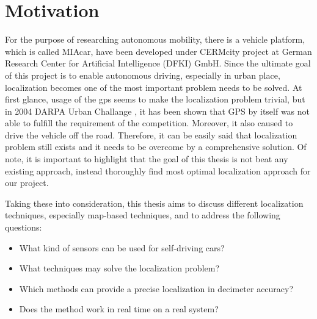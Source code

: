 \section{Motivation}
\par For the purpose of researching autonomous mobility, there is a vehicle platform, which is called MIAcar, have been developed under CERMcity project at  German Research Center for Artificial Intelligence (DFKI) GmbH. Since the ultimate goal of this project is to enable autonomous driving, especially in urban place, localization becomes one of the most important problem needs to be solved. At first glance, usage of the \acrfull{gps} seems to make the localization problem trivial, but in 2004 DARPA Urban Challange \cite{chp2.4}, it has been shown that GPS by itself was not able to fulfill the requirement of the competition. Moreover, it also caused to drive the vehicle off the road. Therefore, it can be easily said that localization problem still exists and it needs to be overcome by a comprehensive solution. Of note, it is important to highlight that the goal of this thesis is not beat any existing approach, instead thoroughly find most optimal localization approach for our project.
\par Taking these into consideration, this thesis aims to discuss different localization techniques, especially map-based techniques, and to address the following questions:
\begin{itemize}
    \item What kind of sensors can be used for self-driving cars?
    \item What techniques may solve the localization problem?
    \item Which methods can provide a precise localization in decimeter accuracy?
    \item Does the method work in real time on a real system? 
\end{itemize}

